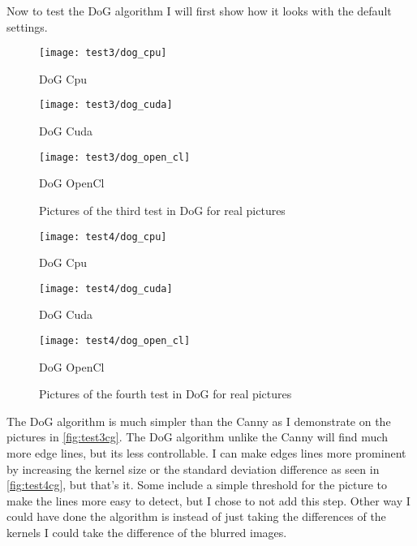 Now to test the \ac{DoG} algorithm I will first show how it looks with the default settings.

\begin{figure}[H]
\centering
\begin{minipage}[t]{.325\textwidth}
\centering
\texttt{[image: test3/dog\_cpu]}
\addtocounter{figure}{-1}
\captionsetup{labelformat=empty}
\caption[]{DoG Cpu}
\end{minipage}
\begin{minipage}[t]{.325\textwidth}
\centering
\texttt{[image: test3/dog\_cuda]}
\addtocounter{figure}{-1}
\captionsetup{labelformat=empty}
\caption[]{DoG Cuda}
\end{minipage}
\begin{minipage}[t]{.325\textwidth}
\centering
\texttt{[image: test3/dog\_open\_cl]}
\addtocounter{figure}{-1}
\captionsetup{labelformat=empty}
\caption[]{DoG OpenCl}
\end{minipage}
\caption{Pictures of the third test in \ac{DoG} for real pictures}
\label{fig:test3cg}
\end{figure}

\begin{figure}[H]
\centering
\begin{minipage}[t]{.325\textwidth}
\centering
\texttt{[image: test4/dog\_cpu]}
\addtocounter{figure}{-1}
\captionsetup{labelformat=empty}
\caption[]{DoG Cpu}
\end{minipage}
\begin{minipage}[t]{.325\textwidth}
\centering
\texttt{[image: test4/dog\_cuda]}
\addtocounter{figure}{-1}
\captionsetup{labelformat=empty}
\caption[]{DoG Cuda}
\end{minipage}
\begin{minipage}[t]{.325\textwidth}
\centering
\texttt{[image: test4/dog\_open\_cl]}
\addtocounter{figure}{-1}
\captionsetup{labelformat=empty}
\caption[]{DoG OpenCl}
\end{minipage}
\caption{Pictures of the fourth test in \ac{DoG} for real pictures}
\label{fig:test4cg}
\end{figure}

The \ac{DoG} algorithm is much simpler than the \ac{Canny} as I demonstrate on the pictures in \autoref{fig:test3cg}. The \ac{DoG} algorithm unlike the \ac{Canny} will find much more edge lines, but its less controllable. I can make edges lines more prominent by increasing the kernel size or the standard deviation difference as seen in \autoref{fig:test4cg}, but that's it. Some include a simple threshold for the picture to make the lines more easy to detect, but I chose to not add this step. Other way I could have done the algorithm is instead of just taking the differences of the kernels I could take the difference of the blurred images.
\clearpage



